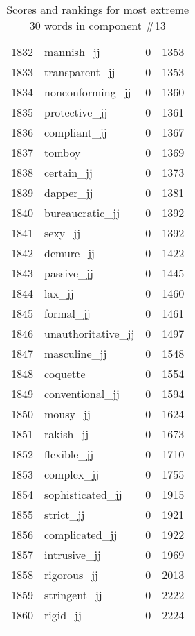 \begin{longtable}[!htbp]{| rlr@{.}l |}
    1832 & mannish\_jj & 0 & 1353 \\
    1833 & transparent\_jj & 0 & 1353 \\
    1834 & nonconforming\_jj & 0 & 1360 \\
    1835 & protective\_jj & 0 & 1361 \\
    1836 & compliant\_jj & 0 & 1367 \\
    1837 & tomboy & 0 & 1369 \\
    1838 & certain\_jj & 0 & 1373 \\
    1839 & dapper\_jj & 0 & 1381 \\
    1840 & bureaucratic\_jj & 0 & 1392 \\
    1841 & sexy\_jj & 0 & 1392 \\
    1842 & demure\_jj & 0 & 1422 \\
    1843 & passive\_jj & 0 & 1445 \\
    1844 & lax\_jj & 0 & 1460 \\
    1845 & formal\_jj & 0 & 1461 \\
    1846 & unauthoritative\_jj & 0 & 1497 \\
    1847 & masculine\_jj & 0 & 1548 \\
    1848 & coquette & 0 & 1554 \\
    1849 & conventional\_jj & 0 & 1594 \\
    1850 & mousy\_jj & 0 & 1624 \\
    1851 & rakish\_jj & 0 & 1673 \\
    1852 & flexible\_jj & 0 & 1710 \\
    1853 & complex\_jj & 0 & 1755 \\
    1854 & sophisticated\_jj & 0 & 1915 \\
    1855 & strict\_jj & 0 & 1921 \\
    1856 & complicated\_jj & 0 & 1922 \\
    1857 & intrusive\_jj & 0 & 1969 \\
    1858 & rigorous\_jj & 0 & 2013 \\
    1859 & stringent\_jj & 0 & 2222 \\
    1860 & rigid\_jj & 0 & 2224 \\
    \hline
    \caption{Scores and rankings for most extreme 30 words in component \#13} \\
\end{longtable}
